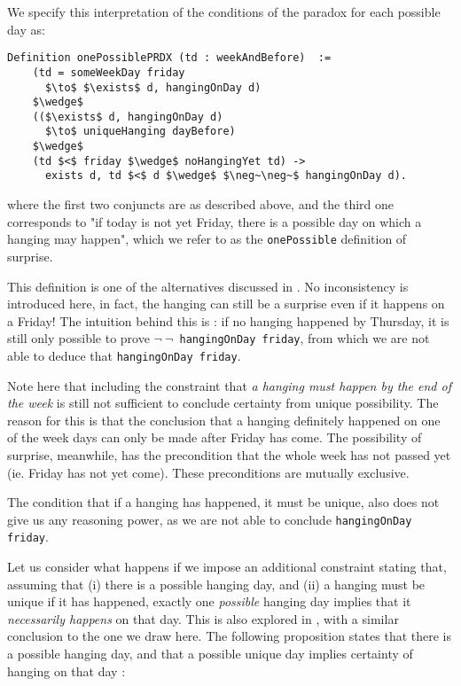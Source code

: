 \documentclass[journal]{journal}
\begin{document}
We specify this interpretation
of the conditions of the paradox for each possible day as:

\begin{lstlisting}[mathescape=true]
  Definition onePossiblePRDX (td : weekAndBefore)  :=
    (td = someWeekDay friday
      $\to$ $\exists$ d, hangingOnDay d)
    $\wedge$
    (($\exists$ d, hangingOnDay d)
      $\to$ uniqueHanging dayBefore)
    $\wedge$
    (td $<$ friday $\wedge$ noHangingYet td) ->
      exists d, td $<$ d $\wedge$ $\neg~\neg~$ hangingOnDay d).
\end{lstlisting}

where the first two conjuncts are as described above, and
the third one corresponds to "if today is not
  yet Friday, there is a possible day on which a hanging may happen", which
  we refer to as the {\tt onePossible} definition of surprise.

This definition is one of the alternatives discussed in \cite{fourpossible}. No inconsistency
is introduced here, in fact, the hanging can still be a surprise even if it
happens on a Friday! The intuition behind this is : if no hanging happened by
Thursday, it is still only possible to prove {\tt $\neg~\neg$~hangingOnDay friday},
from which we are not able to deduce that {\tt hangingOnDay friday}.

Note here that including the constraint that \emph{a hanging must happen
by the end of the week} is still not sufficient to conclude certainty
from unique possibility. The reason for this is that the conclusion that
a hanging definitely happened on one of the week days can only be made
after Friday has come. The possibility of surprise, meanwhile, has the
precondition that the whole week has not passed yet (ie. Friday has not yet come).
These preconditions are mutually exclusive.

The condition that if a hanging has happened, it must be unique, also does not
give us any reasoning power, as we are not able to conclude {\tt hangingOnDay friday}.

Let us consider what happens if we impose an additional constraint stating that, assuming that
(i) there is a possible hanging day, and (ii) a hanging must be unique if it has
happened, exactly one \emph{possible} hanging
day implies that it \emph{necessarily happens} on that day. This is also explored in
\cite{fourpossible}, with a similar conclusion to the one we draw here. The following
proposition states that there is a possible hanging day, and that a possible
unique day implies certainty of hanging on that day :
\end{document}
